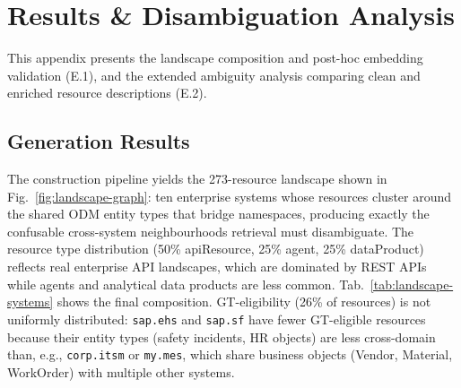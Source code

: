 

\section{Results \& Disambiguation Analysis}
\label{appendix:results-disambiguation}

This appendix presents the landscape composition and post-hoc embedding validation (E.1), and the extended ambiguity analysis comparing clean and enriched resource descriptions (E.2).

\subsection{Generation Results}
\label{appendix:landscape-results}

The construction pipeline yields the 273-resource landscape shown in Fig.~\ref{fig:landscape-graph}: ten enterprise systems whose resources cluster around the shared ODM entity types that bridge namespaces, producing exactly the confusable cross-system neighbourhoods retrieval must disambiguate. The resource type distribution (50\% apiResource, 25\% agent, 25\% dataProduct) reflects real enterprise API landscapes, which are dominated by REST APIs while agents and analytical data products are less common. Tab.~\ref{tab:landscape-systems} shows the final composition. GT-eligibility (26\% of resources) is not uniformly distributed: \texttt{sap.ehs} and \texttt{sap.sf} have fewer GT-eligible resources because their entity types (safety incidents, HR objects) are less cross-domain than, e.g., \texttt{corp.itsm} or \texttt{my.mes}, which share business objects (Vendor, Material, WorkOrder) with multiple other systems.

